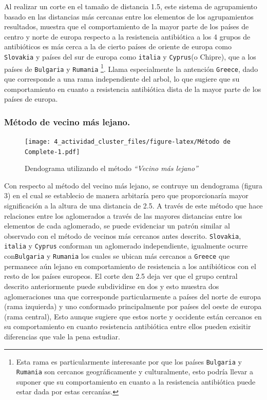 \documentclass[
]{article}
\begin{document}
Al realizar un corte en el tamaño de distancia 1.5, este sistema de
agrupamiento basado en las distancias más cercanas entre los elementos
de los agrupamientos resultados, muestra que el comportamiento de la
mayor parte de los países de centro y norte de europa respecto a la
resistencia antibiótica a los 4 grupos de antibióticos es más cerca a la
de cierto países de oriente de europa como \texttt{Slovakia} y países
del sur de europa como \texttt{italia} y \texttt{Cyprus}(o Chipre), que
a los países de \texttt{Bulgaria} y \texttt{Rumania} \footnote{Esta rama
  es particularmente interesante por que los países \texttt{Bulgaria} y
  \texttt{Rumania} son cercanos geográficamente y culturalmente, esto
  podría llevar a suponer que su comportamiento en cuanto a la
  resistencia antibiótica puede estar dada por estas cercanías.}. Llama
especialmente la antención \texttt{Greece}, dado que corresponde a una
rama independiente del arbol, lo que sugiere que su comportamiento en
cuanto a resistencia antibiótica dista de la mayor parte de los países
de europa.

\hypertarget{muxe9todo-de-vecino-muxe1s-lejano.}{%
\subsubsection{Método de vecino más
lejano.}\label{muxe9todo-de-vecino-muxe1s-lejano.}}

\begin{figure}
\centering
\texttt{[image: 4\_actividad\_cluster\_files/figure-latex/Método de Complete-1.pdf]}
\caption{Dendograma utilizando el método \emph{``Vecino más lejano''}}
\end{figure}

Con respecto al método del vecino más lejano, se contruye un dendograma
(figura 3) en el cual se establecio de manera arbitaría pero que
proporcionaría mayor significación a la altura de una distancia de 2.5.
A través de este método que hace relaciones entre los aglomerados a
través de las mayores distancias entre los elementos de cada aglomerado,
se puede evidenciar un patrón similar al observado con el método de
vecinos más cercanos antes descrito. \texttt{Slovakia}, \texttt{italia}
y \texttt{Cyprus} conforman un aglomerado independiente, igualmente
ocurre con\texttt{Bulgaria} y \texttt{Rumania} los cuales se ubican más
cercanos a \texttt{Greece} que permanece aún lejano en comportamiento de
resistencia a los antibióticos con el resto de los países europeos. El
corte den 2.5 deja ver que el grupo central descrito anteriormente puede
subdividirse en dos y esto muestra dos aglomeraciones una que
corresponde particularmente a países del norte de europa (rama
izquierda) y uno conformado principalmente por países del oeste de
europa (rama central), Esto aunque sugiere que estos norte y occidente
están cercanos en su comportamiento en cuanto resistencia antibiótica
entre ellos pueden exisitir diferencias que vale la pena estudiar.
\end{document}
